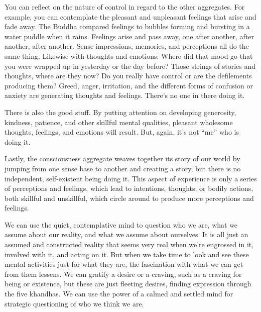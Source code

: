 You can reflect on the nature of control in regard to the other aggregates. For example, you can contemplate the pleasant and unpleasant feelings that arise and fade away. The Buddha compared feelings to bubbles forming and bursting in a water puddle when it rains. Feelings arise and pass away, one after another, after another, after another. Sense impressions, memories, and perceptions all do the same thing. Likewise with thoughts and emotions: Where did that mood go that you were wrapped up in yesterday or the day before? Those strings of stories and thoughts, where are they now? Do you really have control or are the defilements producing them? Greed, anger, irritation, and the different forms of confusion or anxiety are generating thoughts and feelings. There's no one in there doing it.

There is also the good stuff. By putting attention on developing generosity, kindness, patience, and other skillful mental qualities, pleasant wholesome thoughts, feelings, and emotions will result. But, again, it's not ``me'' who is doing it.

Lastly, the consciousness aggregate weaves together its story of our world by jumping from one sense base to another and creating a story, but there is no independent, self-existent being doing it. This aspect of experience is only a series of perceptions and feelings, which lead to intentions, thoughts, or bodily actions, both skillful and unskillful, which circle around to produce more perceptions and feelings.

We can use the quiet, contemplative mind to question who we are, what we assume about our reality, and what we assume about ourselves. It is all just an assumed and constructed reality that seems very real when we're engrossed in it, involved with it, and acting on it. But when we take time to look and see these mental activities just for what they are, the fascination with what we can get from them lessens. We can gratify a desire or a craving, such as a craving for being or existence, but these are just fleeting desires, finding expression through the five khandhas. We can use the power of a calmed and settled mind for strategic questioning of who we think we are.

